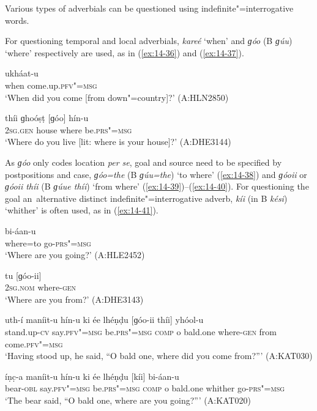  Various types of adverbials can be questioned using indefinite"=interrogative words.


For questioning temporal and local adverbials, \textit{kareé} `when' and \textit{ɡóo} (B \textit{ɡúu}) `where' respectively are used, as in (\ref{ex:14-36}) and (\ref{ex:14-37}). 

\begin{exe}
\ex
\label{ex:14-36}
\gll [kareé] ukháat-u \\
when come.up.\textsc{pfv"=msg} \\
\glt `When did you come [from down"=country]?' (A:HLN2850)

\ex
\label{ex:14-37}
\gll thíi ɡhoóṣṭ [ɡóo] hín-u \\
\textsc{2sg.gen} house where be.\textsc{prs"=msg} \\
\glt `Where do you live [lit: where is your house]?' (A:DHE3144)
\end{exe}

As \textit{ɡóo} only codes location \textit{per se}, goal and source need to be specified by postpositions and case, \textit{ɡóo=the} (B \textit{ɡúu=the}) `to where' (\ref{ex:14-38}) and \textit{ɡóoii} or \textit{ɡóoii thíi} (B \textit{ɡúue thíi}) `from where' (\ref{ex:14-39})--(\ref{ex:14-40}). For questioning the goal an~alternative distinct indefinite"=interrogative adverb, \textit{kíi} (in B \textit{kési}) `whither' is often used, as in (\ref{ex:14-41}).

\begin{exe}
\ex
\label{ex:14-38}
\gll [ɡóo=the] bi-áan-u \\
where=to go-\textsc{prs"=msg } \\
\glt `Where are you going?' (A:HLE2452)

\ex
\label{ex:14-39}
\gll tu [ɡóo-ii] \\
\textsc{2sg.nom} where-\textsc{gen}  \\
\glt `Where are you from?' (A:DHE3143)

\ex
\label{ex:14-40}
\gll uth-í maníit-u hín-u ki ée lhéṇḍu [ɡóo-ii thíi] yhóol-u \\
stand.up-\textsc{cv} say.\textsc{pfv"=msg} be.\textsc{prs"=msg} \textsc{comp} o bald.one where-\textsc{gen} from come.\textsc{pfv"=msg} \\
\glt `Having stood up, he said, ``O bald one, where did you come from?''' (A:KAT030)

\ex
\label{ex:14-41}
\gll íṇc̣-a maníit-u hín-u ki ée lhéṇḍu [kíi] bi-áan-u \\
bear-\textsc{obl} say.\textsc{pfv"=msg} be.\textsc{prs"=msg} \textsc{comp} o bald.one whither go-\textsc{prs"=msg} \\
\glt `The bear said, ``O bald one, where are you going?''' (A:KAT020)
\end{exe}

